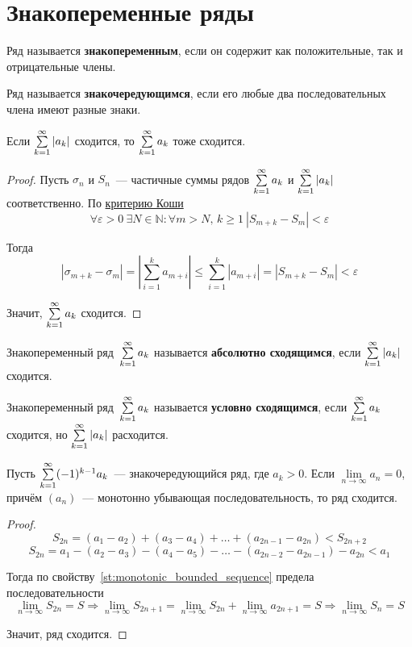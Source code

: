 \section{Знакопеременные ряды}
 Ряд называется \textbf{знакопеременным}, если он содержит как положительные, так и отрицательные члены.

 Ряд называется \textbf{знакочередующимся}, если его любые два последовательных члена имеют разные знаки.

\begin{theorem}
Если $\series |a_k|$ сходится, то $\series a_k$ тоже сходится.
\end{theorem}
\begin{proof}
Пусть $\sigma_n$ и $S_n$~--- частичные суммы рядов $\series a_k$ и $\series |a_k|$ соответственно.
По \hyperref[th:Cauchy_criterion]{критерию Коши}
\begin{equation*}
\forall \varepsilon > 0 \
\exists N \in \mathbb N \colon
\forall m > N,\, k \geqslant 1 \
|S_{m+k} - S_m| < \varepsilon
\end{equation*}

Тогда
\begin{equation*}
|\sigma_{m+k} - \sigma_m| =
\left| \sum_{i=1}^k a_{m+i} \right| \leqslant
\sum_{i=1}^k |a_{m+i}| =
|S_{m+k} - S_m| < \varepsilon
\end{equation*}

Значит, $\series a_k$ сходится.
\end{proof}

Знакопеременный ряд~$\series a_k$ называется \textbf{абсолютно сходящимся}, если $\series |a_k|$ сходится.

Знакопеременный ряд~$\series a_k$ называется \textbf{условно сходящимся}, если $\series a_k$ сходится, но $\series |a_k|$ расходится.

\index{Признак!Лейбница}
\begin{theorem}
Пусть $\series (-1)^{k-1} a_k$~--- знакочередующийся ряд, где $a_k > 0$.
Если $\lim\limits_{n \to \infty} a_n = 0$, причём $(a_n)$~--- монотонно убывающая последовательность, то ряд сходится.
\end{theorem}
\begin{proof}
\begin{equation*}
S_{2n} = (a_1 - a_2) + (a_3 - a_4) + \ldots + (a_{2n-1} - a_{2n}) < S_{2n+2}
\end{equation*}
\begin{equation*}
S_{2n} = a_1 - (a_2 - a_3) - (a_4 - a_5) - \ldots - (a_{2n-2} - a_{2n-1}) - a_{2n} < a_1
\end{equation*}

Тогда по свойству~\ref{st:monotonic_bounded_sequence} предела последовательности
\begin{equation*}
\lim_{n \to \infty} S_{2n} = S \Rightarrow
\lim_{n \to \infty} S_{2n+1} =
\lim_{n \to \infty} S_{2n} + \lim_{n \to \infty} a_{2n+1} =
S \Rightarrow
\lim_{n \to \infty} S_n = S
\end{equation*}

Значит, ряд сходится.
\end{proof}

